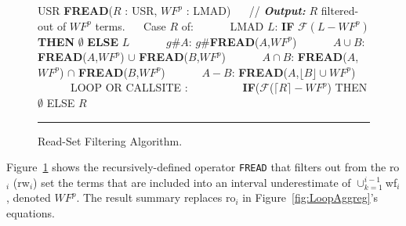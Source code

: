 \documentclass{sig-alternate}
\begin{document}
\begin{figure}[t]
\begin{scriptsize}
USR {\bf FREAD}($R$ : USR, $WF^p$ : LMAD) \vspace{1ex} \newline
$\mbox{ }\mbox{ }$// {\bf {\em Output:}} $R$ filtered-out of $WF^p$ terms. \vspace{1ex} \newline
$\mbox{ }\mbox{ }$Case $R$ of: \vspace{1ex} \newline
$\mbox{ }\mbox{ }\mbox{ }\mbox{ }$ LMAD $L$: %
{\bf IF} $\mathcal{F}(L - WF^p)$ {\bf THEN} $\emptyset$ {\bf ELSE} $L$ \vspace{1ex} \newline
$\mbox{ }\mbox{ }\mbox{ }\mbox{ }$ $g\#A$: $g\#${\bf FREAD}($A$,$WF^p$)  \vspace{1ex} \newline   
$\mbox{ }\mbox{ }\mbox{ }\mbox{ }$ $A \cup B$: {\bf FREAD}($A$,$WF^p$) $\cup$ {\bf FREAD}($B$,$WF^p$) \vspace{1ex} \newline
$\mbox{ }\mbox{ }\mbox{ }\mbox{ }$ $A \cap B$: {\bf FREAD}($A$,$WF^p$) $\cap$ {\bf FREAD}($B$,$WF^p$) \vspace{1ex} \newline
$\mbox{ }\mbox{ }\mbox{ }\mbox{ }$ $A - B$: {\bf FREAD}($A$,$\lfloor B \rfloor \cup WF^p$)   \vspace{1ex} \newline
$\mbox{ }\mbox{ }\mbox{ }\mbox{ }$ LOOP OR CALLSITE :   \vspace{1ex} \newline   
$\mbox{ }\mbox{ }\mbox{ }$ 
$\mbox{ }\mbox{ }\mbox{ }$ 
          {\bf IF}($\mathcal{F}$($\lceil R \rceil - WF^p$) THEN $\emptyset$ ELSE $R$ \vspace{1ex} \newline
\end{scriptsize}
\hrule
\caption{ Read-Set Filtering Algorithm.}
\label{fig:ReadFilt} %
\end{figure}


Figure~\ref{fig:ReadFilt} shows the recursively-defined operator {\tt FREAD} that
filters out from the {\sc ro}$_i$ ({\sc rw}$_i$) set the terms that are included 
into an interval underestimate of $\cup_{k=1}^{i-1}${\sc wf}$_i$, denoted $WF^p$.
The result summary replaces {\sc ro}$_i$ in Figure~\ref{fig:LoopAggreg}'s equations.
\end{document}
